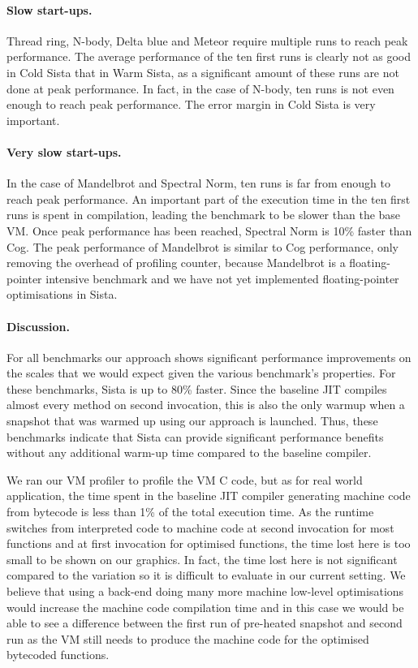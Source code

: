 \documentclass[a4paper,12pt,twoside]{../includes/ThesisStyle}
\begin{document}
	\paragraph{Slow start-ups.} Thread ring, N-body, Delta blue and Meteor require multiple runs to reach peak performance. The average performance of the ten first runs is clearly not as good in Cold Sista that in Warm Sista, as a significant amount of these runs are not done at peak performance. In fact, in the case of N-body, ten runs is not even enough to reach peak performance. The error margin in Cold Sista is very important.

	\paragraph{Very slow start-ups.} In the case of Mandelbrot and Spectral Norm, ten runs is far from enough to reach peak performance. An important part of the execution time in the ten first runs is spent in compilation, leading the benchmark to be slower than the base VM. Once peak performance has been reached, Spectral Norm is 10\% faster than Cog. The peak performance of Mandelbrot is similar to Cog performance, only removing the overhead of profiling counter, because Mandelbrot is a floating-pointer intensive benchmark and we have not yet implemented floating-pointer optimisations in Sista.

	\paragraph{Discussion.}For all benchmarks our approach shows significant performance improvements on the scales that we would expect given the various benchmark's properties. For these benchmarks, Sista is up to 80\% faster. Since the baseline JIT compiles almost every method on second invocation, this is also the only warmup when a snapshot that was warmed up using our approach is launched. Thus, these benchmarks indicate that Sista can provide significant performance benefits without any additional warm-up time compared to the baseline compiler.

	We ran our VM profiler to profile the VM C code, but as for real world application, the time spent in the baseline JIT compiler generating machine code from bytecode is less than 1\% of the total execution time. As the runtime switches from interpreted code to machine code at second invocation for most functions and at first invocation for optimised functions, the time lost here is too small to be shown on our graphics. In fact, the time lost here is not significant compared to the variation so it is difficult to evaluate in our current setting. We believe that using a back-end doing many more machine low-level optimisations would increase the machine code compilation time and in this case we would be able to see a difference between the first run of pre-heated snapshot and second run as the VM still needs to produce the machine code for the optimised bytecoded functions.
\end{document}
